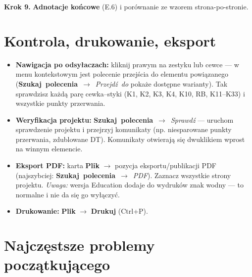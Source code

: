 \documentclass[11pt,a4paper]{article}
\newcommand{\ui}[1]{\textbf{#1}}                    %
\newcommand{\szukaj}[1]{\mbox{\ui{Szukaj polecenia} $\to$ \emph{#1}}} %
\newcommand{\krok}[1]{\par\medskip\noindent\textbf{\color{granat}Krok #1.}\space}
\begin{document}
\krok{9} \textbf{Adnotacje końcowe} (E.6) i porównanie ze wzorem strona-po-stronie.

\section{Kontrola, drukowanie, eksport}

\begin{itemize}
\item \textbf{Nawigacja po odsyłaczach:} kliknij prawym na zestyku lub cewce --- w menu
kontekstowym jest polecenie przejścia do elementu powiązanego (\szukaj{Przejdź do} pokaże
dostępne warianty). Tak sprawdzisz każdą parę cewka--styki (K1, K2, K3, K4, K10, RB, K11--K33)
i wszystkie punkty przerwania.
\item \textbf{Weryfikacja projektu:} \szukaj{Sprawdź} --- uruchom sprawdzenie projektu
i przejrzyj komunikaty (np. niesparowane punkty przerwania, zdublowane DT). Komunikaty otwierają
się dwuklikiem wprost na winnym elemencie.
\item \textbf{Eksport PDF:} karta \ui{Plik} $\to$ pozycja eksportu/publikacji PDF
(najszybciej: \szukaj{PDF}). Zaznacz wszystkie strony projektu. \emph{Uwaga:} wersja Education
dodaje do wydruków znak wodny --- to normalne i nie da się go wyłączyć.
\item \textbf{Drukowanie:} \ui{Plik} $\to$ \ui{Drukuj} (Ctrl+P).
\end{itemize}

\section{Najczęstsze problemy początkującego}
\end{document}
